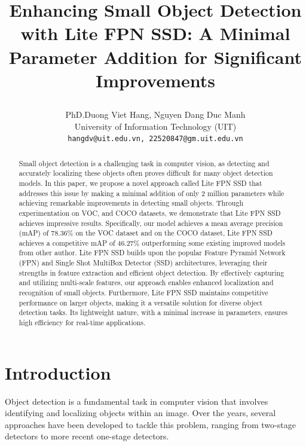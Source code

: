 \documentclass[a4paper]{article}
\title{ 
	\begin{center}
		\textbf{Enhancing Small Object Detection with Lite FPN SSD: A Minimal Parameter Addition for Significant Improvements}
	\end{center}
}
\author{PhD.Duong Viet Hang, Nguyen Dang Duc Manh\\ University of Information Technology (UIT) \\ \texttt{hangdv@uit.edu.vn, 22520847@gm.uit.edu.vn}}
\begin{document}
	
	\maketitle
	
	\begin{abstract}
	Small object detection is a challenging task in computer vision, as detecting and accurately localizing these objects often proves difficult for many object detection models. In this paper, we propose a novel approach called Lite FPN SSD that addresses this issue by making a minimal addition of only 2 million parameters while achieving remarkable improvements in detecting small objects. Through experimentation on VOC, and COCO datasets, we demonstrate that Lite FPN SSD achieves impressive results. Specifically, our model achieves a mean average precision (mAP) of 78.36\% on the VOC dataset and on the COCO dataset, Lite FPN SSD achieves a competitive mAP of 46.27\% outperforming some existing improved models from other author. Lite FPN SSD builds upon the popular Feature Pyramid Network (FPN) and Single Shot MultiBox Detector (SSD) architectures, leveraging their strengths in feature extraction and efficient object detection. By effectively capturing and utilizing multi-scale features, our approach enables enhanced localization and recognition of small objects. Furthermore, Lite FPN SSD maintains competitive performance on larger objects, making it a versatile solution for diverse object detection tasks. Its lightweight nature, with a minimal increase in parameters, ensures high efficiency for real-time applications.

	
	\end{abstract}
	
	\section{Introduction}	
		
	Object detection is a fundamental task in computer vision that involves identifying and localizing objects within an image. Over the years, several approaches have been developed to tackle this problem, ranging from two-stage detectors to more recent one-stage detectors.
	
\end{document}
